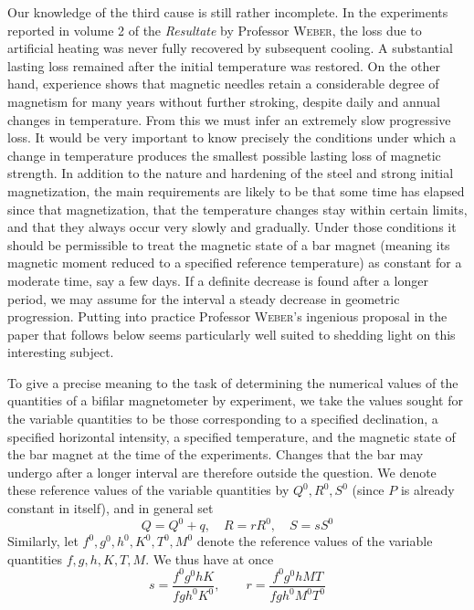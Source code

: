 Our knowledge of the third cause is still rather incomplete. In the experiments reported in volume 2 of the \textit{Resultate} by Professor \textsc{Weber}, the loss due to artificial heating was never fully recovered by subsequent cooling.
A substantial lasting loss remained after the initial temperature was restored. On the other hand, experience shows that magnetic needles retain a considerable degree of magnetism for many years without further stroking, despite daily and annual changes in temperature. From this we must infer an extremely slow progressive loss. It would be very important to know precisely the conditions under which a change in temperature produces the smallest possible lasting loss of magnetic strength. In addition to the nature and hardening of the steel and strong initial magnetization, the main requirements are likely to be that some time has elapsed since that magnetization, that the temperature changes stay within certain limits, and that they always occur very slowly and gradually. Under those conditions it should be permissible to treat the magnetic state of a bar magnet (meaning its magnetic moment reduced to a specified reference temperature) as constant for a moderate time, say a few days. If a definite decrease is found after a longer period, we may assume for the interval a steady decrease in geometric progression. Putting into practice Professor \textsc{Weber}’s ingenious proposal in the paper that follows below seems particularly well suited to shedding light on this interesting subject.

To give a precise meaning to the task of determining the numerical values of the quantities of a bifilar magnetometer by experiment, we take the values sought for the variable quantities to be those corresponding to a specified declination, a specified horizontal intensity, a specified temperature, and the magnetic state of the
bar magnet at the time of the experiments. Changes that the bar may undergo after a longer interval are therefore outside the question. We denote these reference values of the variable quantities by $Q^0,R^0,S^0$ (since $P$ is already constant in itself), and in general set
\[
Q=Q^0+q,\quad R=rR^0,\quad S=sS^0
\]
Similarly, let $f^0,g^0,h^0,K^0,T^0,M^0$ denote the reference values of the variable quantities $f,g,h,K,T,M$. We thus have at once
\[
s=\frac{f^0g^0hK}{fgh^0K^0},\qquad r=\frac{f^0g^0hMT}{fgh^0M^0T^0}
\]

